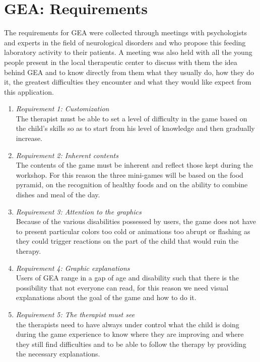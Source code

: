 \documentclass{sigchi-ext}
\begin{document}
\section{GEA: Requirements}
The requirements for GEA were collected through meetings with psychologists and experts in the field of neurological disorders and who propose this feeding laboratory activity to their patients. A meeting was also held with all the young people present in the local therapeutic center to discuss with them the idea behind GEA and to know directly from them what they usually do, how they do it, the greatest difficulties they encounter and what they would like expect from this application.
\begin{enumerate}
\item \textit{Requirement 1: Customization}\\
      The therapist must be able to set a level of difficulty in the game based on the child's skills so 		  as to start from his level of knowledge and then gradually increase.
\item \textit{Requirement 2: Inherent contents}\\
	  The contents of the game must be inherent and reflect those kept during the workshop. For this 			  reason the three mini-games will be based on the food pyramid, on the recognition of healthy foods 		  and on the ability to combine dishes and meal of the day.
\item \textit{Requirement 3: Attention to the graphics}\\
	  Because of the various disabilities possessed by users, the game does not have to present particular 	  colors too cold or animations too abrupt or flashing as they could trigger reactions on the part of 		  the child that would ruin the therapy.
\item \textit{Requirement 4: Graphic explanations}\\
	  Users of GEA range in a gap of age and disability such that there is the possibility that not 			  everyone can read, for this reason we need visual explanations about the goal of the game and how to 	  do it.
\item \textit{Requirement 5: The therapist must see}\\
	  the therapists need to have always under control what the child is doing during the game experience 		  to know where they are improving and where they still find difficulties and to be able to follow the 	  therapy by providing the necessary explanations.
\end{enumerate}
\end{document}

